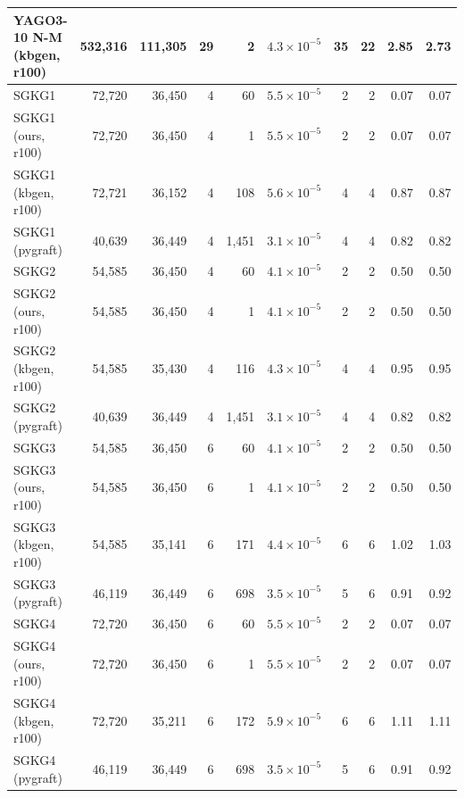 \begin{tabular}{lrrrrrrrrr}
YAGO3-10 N-M (kbgen, r100) & 532{,}316 & 111{,}305 & 29 & 2 & $4.3\times10^{-5}$ & 35 & 22 & 2.85 & 2.73 \\
\midrule
SGKG1 & 72{,}720 & 36{,}450 & 4 & 60 & $5.5\times10^{-5}$ & 2 & 2 & 0.07 & 0.07 \\
SGKG1 (ours, r100) & 72{,}720 & 36{,}450 & 4 & 1 & $5.5\times10^{-5}$ & 2 & 2 & 0.07 & 0.07 \\
SGKG1 (kbgen, r100) & 72{,}721 & 36{,}152 & 4 & 108 & $5.6\times10^{-5}$ & 4 & 4 & 0.87 & 0.87 \\
SGKG1 (pygraft) & 40{,}639 & 36{,}449 & 4 & 1{,}451 & $3.1\times10^{-5}$ & 4 & 4 & 0.82 & 0.82 \\
\midrule
SGKG2 & 54{,}585 & 36{,}450 & 4 & 60 & $4.1\times10^{-5}$ & 2 & 2 & 0.50 & 0.50 \\
SGKG2 (ours, r100) & 54{,}585 & 36{,}450 & 4 & 1 & $4.1\times10^{-5}$ & 2 & 2 & 0.50 & 0.50 \\
SGKG2 (kbgen, r100) & 54{,}585 & 35{,}430 & 4 & 116 & $4.3\times10^{-5}$ & 4 & 4 & 0.95 & 0.95 \\
SGKG2 (pygraft) & 40{,}639 & 36{,}449 & 4 & 1{,}451 & $3.1\times10^{-5}$ & 4 & 4 & 0.82 & 0.82 \\
\midrule
SGKG3 & 54{,}585 & 36{,}450 & 6 & 60 & $4.1\times10^{-5}$ & 2 & 2 & 0.50 & 0.50 \\
SGKG3 (ours, r100) & 54{,}585 & 36{,}450 & 6 & 1 & $4.1\times10^{-5}$ & 2 & 2 & 0.50 & 0.50 \\
SGKG3 (kbgen, r100) & 54{,}585 & 35{,}141 & 6 & 171 & $4.4\times10^{-5}$ & 6 & 6 & 1.02 & 1.03 \\
SGKG3 (pygraft) & 46{,}119 & 36{,}449 & 6 & 698 & $3.5\times10^{-5}$ & 5 & 6 & 0.91 & 0.92 \\
\midrule
SGKG4 & 72{,}720 & 36{,}450 & 6 & 60 & $5.5\times10^{-5}$ & 2 & 2 & 0.07 & 0.07 \\
SGKG4 (ours, r100) & 72{,}720 & 36{,}450 & 6 & 1 & $5.5\times10^{-5}$ & 2 & 2 & 0.07 & 0.07 \\
SGKG4 (kbgen, r100) & 72{,}720 & 35{,}211 & 6 & 172 & $5.9\times10^{-5}$ & 6 & 6 & 1.11 & 1.11 \\
SGKG4 (pygraft) & 46{,}119 & 36{,}449 & 6 & 698 & $3.5\times10^{-5}$ & 5 & 6 & 0.91 & 0.92 \\
\bottomrule
\end{tabular}
